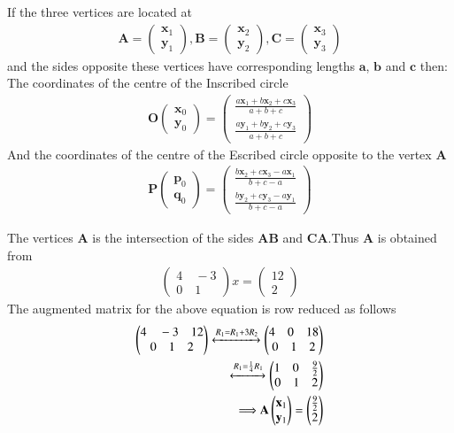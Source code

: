 \documentclass[journal,12pt,twocolumn]{IEEEtran}
\newcommand{\myvec}[1]{\ensuremath{\begin{pmatrix}#1\end{pmatrix}}}
\numberwithin{equation}{subsection}
\let\vec\mathbf
\begin{document}
If the three vertices are located at\begin{align}
     \vec{A}=\myvec{\vec{x}_1 \\\vec{y}_1},
     \vec{B}= \myvec{\vec{x}_2 \\\vec{y}_2},
     \vec{C}=\myvec{\vec{x}_3\\\vec{y}_3}
\end{align} 
and the sides opposite these vertices have corresponding lengths $\vec{a}$, $\vec{b}$ and $\vec{c}$ then:\\
 The coordinates of the centre of the Inscribed circle
 \begin{align}
 \vec{O}\myvec{\vec{x}_0 \\\vec{y}_0}=\myvec{\frac{a\vec{x}_1+ b\vec{x}_2+c\vec{x}_3}{a+b+c}\\ \frac{a\vec{y}_1+b\vec{y}_2+c\vec{y}_3}{a+b+c}}
 \end{align} 
And the coordinates of the centre of the Escribed circle  opposite to the vertex $\vec{A}$
 \begin{align}
\vec{P}\myvec{\vec{p}_0 \\\vec{q}_0}=\myvec{\frac{ b\vec{x}_2+c\vec{x}_3-a\vec{x}_1}{b+c-a}\\ \frac{b\vec{y}_2+c\vec{y}_3-a\vec{y}_1}{b+c-a}}
 \end{align}
 
 The vertices $\vec{A}$ is the intersection of the sides $\vec{AB}$ and $\vec{CA}$.Thus $\vec{A}$ is obtained from
 \begin{align}
 \myvec{4\quad-3\\0\quad1}x=\myvec{12\\2}
 \end{align}
 The augmented matrix for the above equation is row reduced as follows
 \begin{align}
 \myvec{4\quad-3\quad 12\\0\quad1\quad2}\xleftrightarrow{R_1=R_1+3R_2}\myvec{4\quad0\quad 18\\0\quad1\quad2}\\\xleftrightarrow{R_1=\frac{1}{4}R_1}\myvec{1\quad0\quad\frac{9}{2}\\0\quad1\quad2}\\
 \Longrightarrow\vec{A}\myvec{\vec{x}_1 \\\vec{y}_1}=\myvec{\frac{9}{2}\\2}
 \end{align}
 
\end{document}
